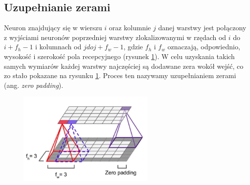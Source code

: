 \documentclass{article}
\begin{document}
\subsection{Uzupełnianie zerami}
Neuron znajdujący się w wierszu $i$ oraz kolumnie $j$ danej warstwy jest połączony z wyjściami neuronów poprzedniej warstwy zlokalizowanymi w rzędach od $i$ do $i+f_{h}-1$ i kolumnach od $j do j+f_{w}-1$, gdzie $f_{h}$ i $f_{w}$ oznaczają, odpowiednio, wysokość i szerokość pola recepcyjnego (rysunek \ref{padding}). W celu uzyskania takich samych wymiarów każdej warstwy najczęściej są dodawane zera wokół wejść, co zo stało pokazane na rysunku \ref{padding}. Proces ten nazywamy uzupełnianiem zerami (ang. \textit{zero padding}). \cite{geron}
\begin{figure}[H]
	\centering
	\includegraphics[width=0.6\textwidth,keepaspectratio=true]{padding}
	\caption{}
	\label{padding}
\end{figure}

\end{document}
